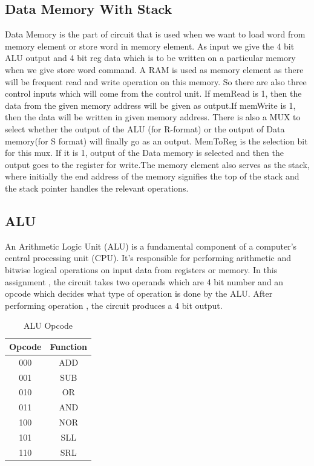 \documentclass{article}
\begin{document}
\subsection{Data Memory With Stack}
Data Memory is the part of circuit that is used when we want to load word from memory element or store word in memory element. As input we give the 4 bit ALU output and 4 bit reg data which is to be written on a particular memory when we give store word command. A RAM is used as memory element as there will be frequent read and write operation on this memory. So there are also three control inputs which will come from the control unit. If memRead is 1, then the data from the given memory address will be given as output.If memWrite is 1, then the data will be written in given memory address. There is also a MUX to select whether the output of the ALU (for R-format) or the output of Data memory(for S format) will finally go as an output. MemToReg is the selection bit for this mux. If it is 1, output of the Data memory is selected and then the output goes to the register for write.The memory element also serves as the stack, where initially the end address of the memory signifies the top of the stack and the stack pointer handles the relevant operations.


\subsection{ALU}
An Arithmetic Logic Unit (ALU) is a fundamental component of a computer's central processing unit (CPU). It's responsible for performing arithmetic and bitwise logical operations on input data from registers or memory. In this assignment , the circuit takes two operands which are 4 bit number and an opcode which decides what type of operation is done by the ALU. After performing operation , the circuit produces a 4 bit output. 

\begin{table}[!h]
    \centering
    \begin{tabular}{|c|c|}
\hline
Opcode & Function \\
\hline
000 & ADD \\
\hline
001 & SUB \\
\hline
010 & OR \\
\hline
011 & AND \\
\hline
100 & NOR \\
\hline
101 & SLL \\
\hline
110 & SRL \\
\hline
\end{tabular}
    \caption{ALU Opcode}
    \label{tab:my_label}
\end{table}
\end{document}
